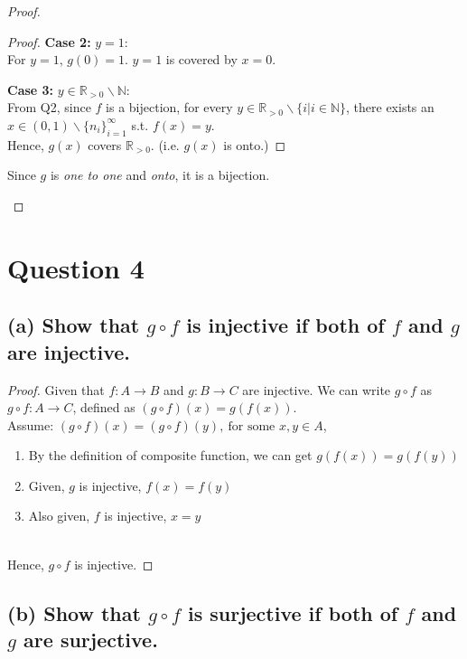 \documentclass{article}
\begin{document}
\begin{proof}
\begin{itemize}
\begin{proof}
            \textbf{Case 2:} \( y = 1 \):
            \\
            For $y = 1$, $g(0) = 1$. $y = 1$ is covered by $x = 0$.

            \textbf{Case 3:} \( y \in \mathbb{R}_{>0} \backslash \mathbb{N} \):
            \\
            From Q2, since $f$ is a bijection, for every $y \in \mathbb{R}_{>0} \backslash \{i | i \in \mathbb{N}\}$, there exists an $x \in (0,1) \backslash \{n_i\}_{i=1}^{\infty}$ s.t. $f(x) = y$.
            \\
            Hence, $g(x)$ covers $\mathbb{R}_{>0}$. (i.e. $g(x)$ is onto.)
        \end{proof}
        Since $g$ is \textit{one to one} and \textit{onto}, it is a bijection.
    \end{itemize}
\end{proof}

\section*{Question 4}

\subsection*{(a) Show that $g \circ f$ is injective if both of $f$ and $g$ are injective.}

\begin{proof}
    Given that $f : A \rightarrow B$ and $g : B \rightarrow C$ are injective. 
    We can write $g \circ f$ as $g \circ f: A \rightarrow C$, defined as $(g \circ f)(x) = g(f(x))$.
    \\
    Assume: $(g \circ f)(x) = (g \circ f)(y), \ \text{for some $x,y \in A$} $, 
    \begin{enumerate}
        \item By the definition of composite function, we can get $g(f(x)) = g(f(y))$
        \item Given, $g$ is injective, $f(x) = f(y)$
        \item Also given, $f$ is injective, $x = y$
    \end{enumerate}
    \\
    Hence, $g \circ f$ is injective. 
\end{proof}

\subsection*{(b) Show that $g \circ f$ is surjective if both of $f$ and $g$ are surjective.}
\end{document}

